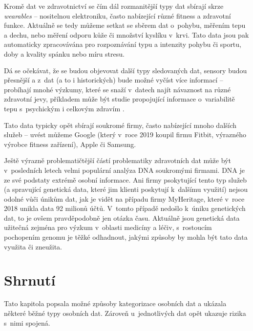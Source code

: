Kromě dat ve zdravotnictví se čím dál rozmanitější typy dat sbírají skrze \textit{wearables} -- nositelnou elektroniku, často nabízející různé fitness a zdravotní funkce. Aktuálně se tedy můžeme setkat se sběrem dat o~pohybu, měřením tepu a dechu, nebo měření odporu kůže či množství kyslíku v~krvi.
Tato data jsou pak automaticky zpracovávána pro rozpoznávání typu a intenzity pohybu či sportu, doby a kvality spánku nebo míru stresu.

Dá se očekávat, že se budou objevovat další typy sledovaných dat, sensory budou přesnější a z~dat (a to i historických) bude možné vyčíst více informací -- probíhají mnohé výzkumy, které se snaží v~datech najít návaznost na různé zdravotní jevy, příkladem může být studie propojující informace o~variabilitě tepu s~psychickým i celkovým zdravím \citep{heart-rate-health}.

Tato data typicky opět sbírají soukromé firmy, často nabízející mnoho dalších služeb -- uvést můžeme Google (který v~roce 2019 koupil firmu Fitbit, výrazného výrobce fitness zařízení), Apple či Samsung.

Ještě výrazně problematičtější částí problematiky zdravotních dat může být v~posledních letech velmi populární analýza DNA soukromými firmami. DNA je ze své podstaty extrémě osobní informace. Ani firmy psokytující tento typ služeb (a spravující genetická data, které jim klienti poskytují k~dalšímu využití) nejsou odolné vůči únikům dat, jak je vidět na případu firmy MyHeritage, které v~roce 2018 unikla data 92 milionů účtů. V~tomto případě nedošlo k~úniku genetických dat, to je ovšem pravděpodobně jen otázka času. Aktuálně jsou genetická data užitečná zejména pro výzkum v~oblasti medicíny a léčiv, s~rostoucím pochopením genomu je těžké odhadnout, jakými způsoby by mohla být tato data využita či zneužita.


\section*{Shrnutí}
Tato kapitola popsala možné způsoby kategorizace osobních dat a ukázala některé běžné typy osobních dat.
Zároveň u~jednotlivých dat opět ukazuje rizika s~nimi spojená.